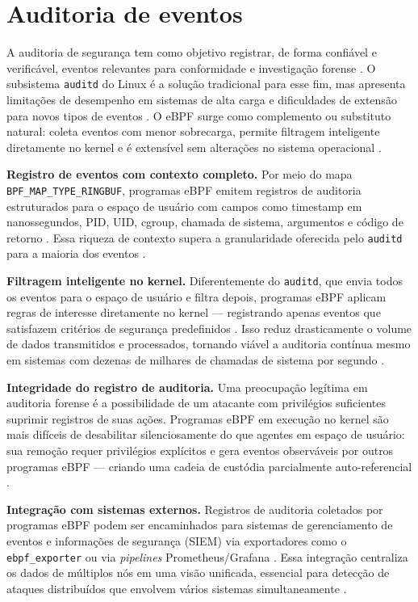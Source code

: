 \section{Auditoria de eventos}

A auditoria de segurança tem como objetivo registrar, de forma confiável e
verificável, eventos relevantes para conformidade e investigação forense
\cite{beyer2016}.
O subsistema \texttt{auditd} do Linux é a solução tradicional para esse fim, mas
apresenta limitações de desempenho em sistemas de alta carga e dificuldades de
extensão para novos tipos de eventos \cite{gregg2020}.
O eBPF surge como complemento ou substituto natural: coleta eventos com menor
sobrecarga, permite filtragem inteligente diretamente no kernel e é extensível sem
alterações no sistema operacional \cite{cassagnes2020}.

\textbf{Registro de eventos com contexto completo.}
Por meio do mapa \texttt{BPF\_MAP\_TYPE\_RINGBUF}, programas eBPF emitem registros
de auditoria estruturados para o espaço de usuário com campos como timestamp em
nanossegundos, PID, UID, cgroup, chamada de sistema, argumentos e código de retorno
\cite{linuxkernel2024}.
Essa riqueza de contexto supera a granularidade oferecida pelo \texttt{auditd}
para a maioria dos eventos \cite{gregg2019}.

\textbf{Filtragem inteligente no kernel.}
Diferentemente do \texttt{auditd}, que envia todos os eventos para o espaço de
usuário e filtra depois, programas eBPF aplicam regras de interesse diretamente
no kernel — registrando apenas eventos que satisfazem critérios de segurança
predefinidos \cite{linuxkernel2024}.
Isso reduz drasticamente o volume de dados transmitidos e processados, tornando
viável a auditoria contínua mesmo em sistemas com dezenas de milhares de chamadas
de sistema por segundo \cite{cassagnes2020}.

\textbf{Integridade do registro de auditoria.}
Uma preocupação legítima em auditoria forense é a possibilidade de um atacante com
privilégios suficientes suprimir registros de suas ações.
Programas eBPF em execução no kernel são mais difíceis de desabilitar
silenciosamente do que agentes em espaço de usuário: sua remoção requer privilégios
explícitos e gera eventos observáveis por outros programas eBPF — criando
uma cadeia de custódia parcialmente auto-referencial \cite{majors2022}.

\textbf{Integração com sistemas externos.}
Registros de auditoria coletados por programas eBPF podem ser encaminhados para
sistemas de gerenciamento de eventos e informações de segurança (SIEM) via
exportadores como o \texttt{ebpf\_exporter} \cite{ebpfexporter} ou via
\textit{pipelines} Prometheus/Grafana \cite{prometheusdocs,grafanadocs}.
Essa integração centraliza os dados de múltiplos nós em uma visão unificada,
essencial para detecção de ataques distribuídos que envolvem vários sistemas
simultaneamente \cite{beyer2016}.